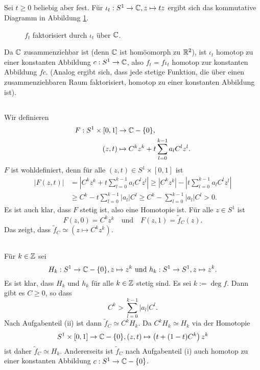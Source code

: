 \documentclass[a4paper,10pt]{article}
\begin{document}
\subsection{}
Sei $t \geq 0$ beliebig aber fest. Für $\iota_t : S^1 \to \mathbb{C}, z \mapsto tz$ ergibt sich das kommutative Diagramm in Abbildung \ref{fig: f_t faktorisiert}.
\begin{figure}\centering
 \caption{$f_t$ faktorisiert durch $\iota_t$ über $\mathbb{C}$.}
 \label{fig: f_t faktorisiert}
\end{figure}
Da $\mathbb{C}$ zusammenziehbar ist (denn $\mathbb{C}$ ist homöomorph zu $\mathbb{R}^2$), ist $\iota_t$ homotop zu einer konstanten Abbildung $c : S^1 \to \mathbb{C}$, also $f_t = f \iota_t$ homotop zur konstanten Abbildung $f c$. (Analog ergibt sich, dass jede stetige Funktion, die über einen zusammenziehbaren Raum faktorisiert, homotop zu einer konstanten Abbildung ist).


\subsection{}
Wir definieren
\begin{align*}
 F : S^1 \times [0,1] &\to \mathbb{C} - \{0\}, \\
 (z,t) &\mapsto C^k z^k + t \sum_{l=0}^{k-1} a_l C^l z^l.
\end{align*}
$F$ ist wohldefiniert, denn für alle $(z,t) \in S^1 \times [0,1]$ ist
\begin{align*}
 |F(z,t)|
 &=  \left| C^k z^k + t \sum_{l=0}^{k-1} a_l C^l z^l \right|
 \geq \left| C^k z^k \right| - \left| t \sum_{l=0}^{k-1} a_l C^l z^l \right| \\
 &\geq C^k - t \sum_{l=0}^{k-1} |a_l| C^l
 \geq C^k - \sum_{l=0}^{k-1} |a_l| C^l
 > 0.
\end{align*}
Es ist auch klar, dass $F$ stetig ist, also eine Homotopie ist. Für alle $z \in S^1$ ist
\[
 F(z,0) = C^k z^k \quad \text{und} \quad F(z,1) = \tilde{f}_C(z).
\]
Das zeigt, dass $\tilde{f}_C \simeq \left(z \mapsto C^k z^k\right)$.


\subsection{}
Für $k \in \mathbb{Z}$ sei
\[
 H_k : S^1 \to \mathbb{C} - \{0\}, z \mapsto z^k \text{ und }
 h_k : S^1 \to S^1, z \mapsto z^k.
\]
Es ist klar, dass $H_k$ und $h_k$ für alle $k \in \mathbb{Z}$ stetig sind. Es sei $k := \deg f$.
Dann gibt es $C \geq 0$, so dass
\[
 C^k > \sum_{l=0}^{k-1} |a_l| C^l.
\]
Nach Aufgabenteil (ii) ist dann $\tilde{f}_C \simeq C^k H_k$. Da $C^k H_k \simeq H_k$ via der Homotopie
\[
 S^1 \times [0,1] \to \mathbb{C} - \{0\}, (z,t) \mapsto  \left(t + (1-t)C^k\right) z^k
\]
ist daher $\tilde{f}_C \simeq H_k$. Andererseits ist $\tilde{f}_C$ nach Aufgabenteil (i) auch homotop zu einer konstanten Abbildung $c : S^1 \to \mathbb{C} - \{0\}$.
\end{document}
